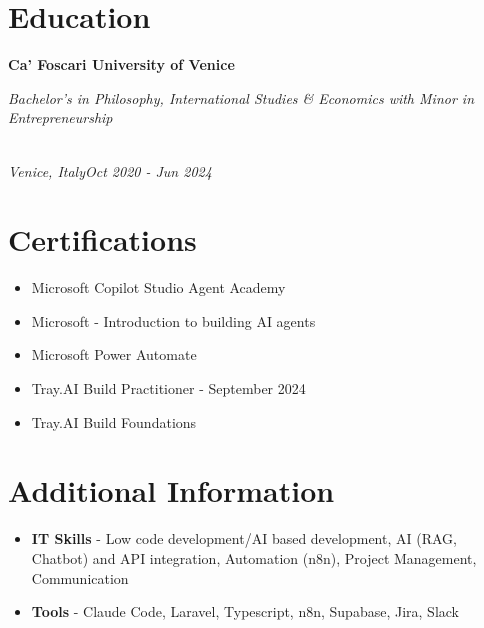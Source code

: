 \documentclass[a4paper,10pt]{article}
\newcommand{\role}[4]{\vspace{3pt}\noindent\hspace{0.6em}\parbox[t]{0.38\textwidth}{\raggedright\textbf{#1}}\hfill\parbox[t]{0.58\textwidth}{\raggedleft\textit{#2}}\\{\textit{#3}\hfill\textit{#4}}\vspace{1pt}}
\begin{document}
\section{Education}
\role{Ca' Foscari University of Venice}{Bachelor's in Philosophy, International Studies \& Economics with Minor in Entrepreneurship}{Venice, Italy}{Oct 2020 - Jun 2024}

\section{Certifications}
\begin{itemize}
\item Microsoft Copilot Studio Agent Academy
\item Microsoft - Introduction to building AI agents
\item Microsoft Power Automate
\item Tray.AI Build Practitioner - September 2024
\item Tray.AI Build Foundations
\end{itemize}

\section{Additional Information}
\begin{itemize}
\item \textbf{IT Skills} - Low code development/AI based development, AI (RAG, Chatbot) and API integration, Automation (n8n), Project Management, Communication
\item \textbf{Tools} - Claude Code, Laravel, Typescript, n8n, Supabase, Jira, Slack
\end{itemize}
\end{document}
